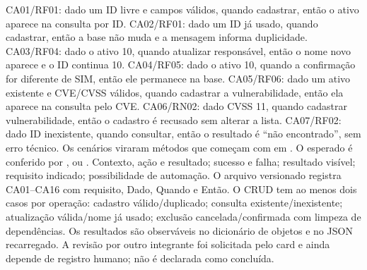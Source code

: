 
 CA01/RF01: dado um ID livre e campos válidos, quando cadastrar, então o ativo aparece na consulta por ID. CA02/RF01: dado um ID já usado, quando cadastrar, então a base não muda e a mensagem informa duplicidade. CA03/RF04: dado o ativo 10, quando atualizar responsável, então o nome novo aparece e o ID continua 10. CA04/RF05: dado o ativo 10, quando a confirmação for diferente de SIM, então ele permanece na base. CA05/RF06: dado um ativo existente e CVE/CVSS válidos, quando cadastrar a vulnerabilidade, então ela aparece na consulta pelo CVE.
 CA06/RN02: dado CVSS 11, quando cadastrar vulnerabilidade, então o cadastro é recusado sem alterar a lista. CA07/RF02: dado ID inexistente, quando consultar, então o resultado é ``não encontrado'', sem erro técnico.
 Os cenários viraram métodos que começam com  em . O esperado é conferido por ,  ou .
 Contexto, ação e resultado; sucesso e falha; resultado visível; requisito indicado; possibilidade de automação.
 O arquivo versionado  registra CA01--CA16 com requisito, Dado, Quando e Então. O CRUD tem ao menos dois casos por operação: cadastro válido/duplicado; consulta existente/inexistente; atualização válida/nome já usado; exclusão cancelada/confirmada com limpeza de dependências. Os resultados são observáveis no dicionário de objetos e no JSON recarregado. A revisão por outro integrante foi solicitada pelo card e ainda depende de registro humano; não é declarada como concluída.

